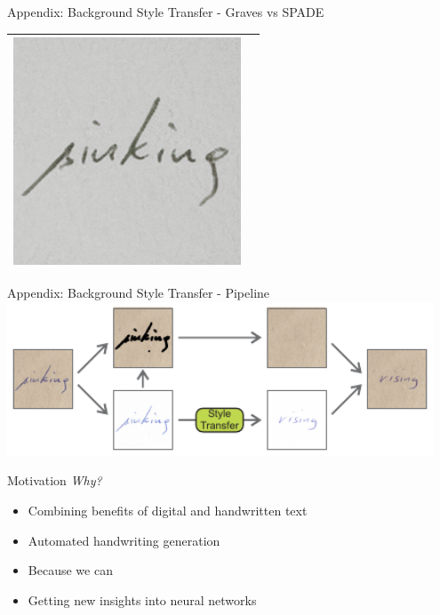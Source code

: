 \documentclass[aspectratio=169]{beamer}
\begin{document}
\begin{frame}{Appendix: Background Style Transfer - Graves vs SPADE}
{\begin{tabular}{lc}
{  \includegraphics[scale=0.18]{../thesis/assets/background_style_transfer/spade/result/99.png}%
  }
  \\
  \bottomrule
  \end{tabular}
  }
\end{frame}


\begin{frame}{Appendix: Background Style Transfer - Pipeline}
    \centering
    \vspace{1em}
    \includegraphics[width=0.95\textwidth]{../thesis/assets/background_style_transfer/pipeline/pipeline.pdf}
\end{frame}








\begin{frame}{Motivation}
\emph{Why?}
\begin{itemize}
\item Combining benefits of digital and handwritten text
\item Automated handwriting generation
\item Because we can
\item Getting new insights into neural networks
\end{itemize}
\end{frame}
\end{document}
